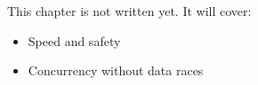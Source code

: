 \label{ch:rust2}
\begin{keyidea}
This chapter is not written yet. It will cover:
\begin{itemize}[nosep]
  \item Speed and safety
  \item Concurrency without data races
\end{itemize}
\end{keyidea}
